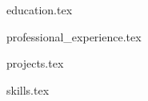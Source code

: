 \documentclass{resume} %
\begin{document}
\vspace{-0.5em}

{education.tex}

{professional_experience.tex}



{projects.tex}

{skills.tex}

\end{document}
